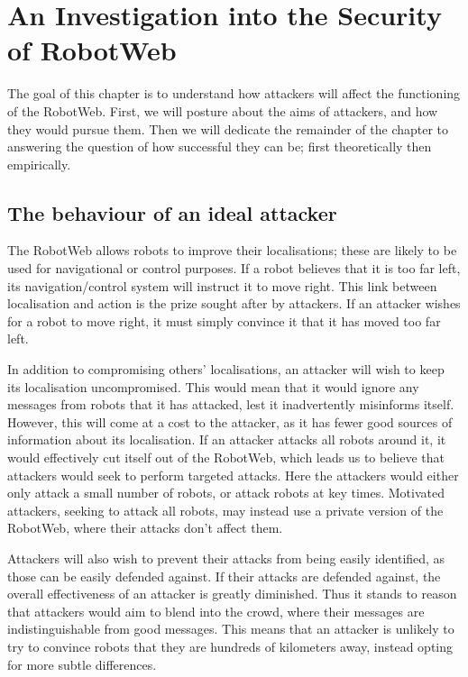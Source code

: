 \chapter{An Investigation into the Security of RobotWeb}
The goal of this chapter is to understand how attackers will affect the functioning of the RobotWeb. First, we will posture about the aims of attackers, and how they would pursue them. Then we will dedicate the remainder of the chapter to answering the question of how successful they can be; first theoretically then empirically.

\section{The behaviour of an ideal attacker}
The RobotWeb allows robots to improve their localisations; these are likely to be used for navigational or control purposes. If a robot believes that it is too far left, its navigation/control system will instruct it to move right. This link between localisation and action is the prize sought after by attackers. If an attacker wishes for a robot to move right, it must simply convince it that it has moved too far left.

In addition to compromising others' localisations, an attacker will wish to keep its localisation uncompromised. This would mean that it would ignore any messages from robots that it has attacked, lest it inadvertently misinforms itself. However, this will come at a cost to the attacker, as it has fewer good sources of information about its localisation. If an attacker attacks all robots around it, it would effectively cut itself out of the RobotWeb, which leads us to believe that attackers would seek to perform targeted attacks. Here the attackers would either only attack a small number of robots, or attack robots at key times. Motivated attackers, seeking to attack all robots, may instead use a private version of the RobotWeb, where their attacks don't affect them.

Attackers will also wish to prevent their attacks from being easily identified, as those can be easily defended against. If their attacks are defended against, the overall effectiveness of an attacker is greatly diminished. Thus it stands to reason that attackers would aim to blend into the crowd, where their messages are indistinguishable from good messages. This means that an attacker is unlikely to try to convince robots that they are hundreds of kilometers away, instead opting for more subtle differences.

